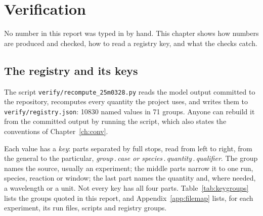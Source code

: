 \chapter{Verification}
\label{ch:verify}

No number in this report was typed in by hand. This chapter shows how numbers are
produced and checked, how to read a registry key, and what the checks catch.

\section{The registry and its keys}
\label{sec:keys}

The script \texttt{verify/recompute\_25m0328.py} reads the model output committed to the
repository, recomputes every quantity the project uses, and writes them to
\texttt{verify/registry.json}: 10830 named values in 71 groups. Anyone can rebuild it
from the committed output by running the script, which also states the conventions of
Chapter~\ref{ch:conv}.

Each value has a \emph{key}: parts separated by full stops, read from left to right,
from the general to the particular,
\emph{group}\,.\,\emph{case or species}\,.\,\emph{quantity}\,.\,\emph{qualifier}. The
group names the source, usually an experiment; the middle parts narrow it to one run,
species, reaction or window; the last part names the quantity and, where needed, a
wavelength or a unit. Not every key has all four parts. Table~\ref{tab:keygroups} lists
the groups quoted in this report, and Appendix~\ref{app:filemap} lists, for each
experiment, its run files, scripts and registry groups.

